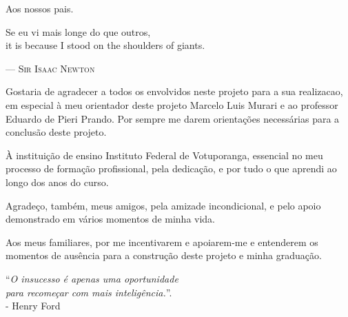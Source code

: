 \documentclass[english,brazilian]{UNISINOSmonografia}
\begin{document}
\capa
\folhaderosto

%
\begin{dedicatoria}
Aos nossos pais.\\[4ex] %
\begin{itshape} %
Se eu vi mais longe do que outros,\\
it is because I stood on the shoulders of giants.\\
\end{itshape}
--- \textsc{Sir Isaac Newton} %
\end{dedicatoria}

\begin{agradecimentos}
Gostaria de agradecer a todos os envolvidos neste projeto para a sua realizacao, em especial à meu orientador deste projeto Marcelo Luis Murari e ao professor Eduardo de Pieri Prando. Por sempre me darem orientações necessárias para a conclusão deste projeto.

À instituição de ensino Instituto Federal de Votuporanga, essencial no meu processo de formação profissional, pela dedicação, e por tudo o que aprendi ao longo dos anos do curso.

Agradeço, também, meus amigos, pela amizade incondicional, e pelo apoio demonstrado em vários momentos de minha vida.

Aos meus familiares, por me incentivarem e apoiarem-me e entenderem os momentos de ausência para a construção deste projeto e minha graduação.
\end{agradecimentos}

%
\begin{epigrafe}
``\textit{O insucesso é apenas uma oportunidade \\
para recomeçar com mais inteligência.}''.\\
- Henry Ford
\end{epigrafe}
\end{document}
